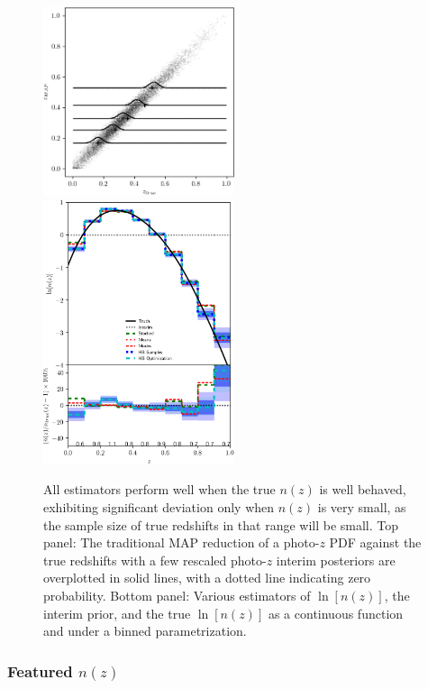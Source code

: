 \documentclass[iop]{emulateapj}
\begin{document}
\begin{figure}
	\begin{center}
		\includegraphics[width=0.5\textwidth]{fig/smooth_truth/scatter.png}\\
		\includegraphics[width=0.5\textwidth]{fig/smooth_truth/estimators.png}	
		\caption{All estimators perform well when the true $n(z)$ is well behaved, exhibiting significant deviation only when $n(z)$ is very small, as the sample size of true redshifts in that range will be small.  Top panel: The traditional MAP reduction of a photo-$z$ PDF against the true redshifts with a few rescaled photo-$z$ interim posteriors are overplotted in solid lines, with a dotted line indicating zero probability.  Bottom panel: Various estimators of $\ln[n(z)]$, the interim prior, and the true $\ln[n(z)]$ as a continuous function and under a binned parametrization.}
		\label{fig:featured}
	\end{center}
\end{figure}

\subsubsection{Featured $n(z)$}
\label{sec:featured}
\end{document}
